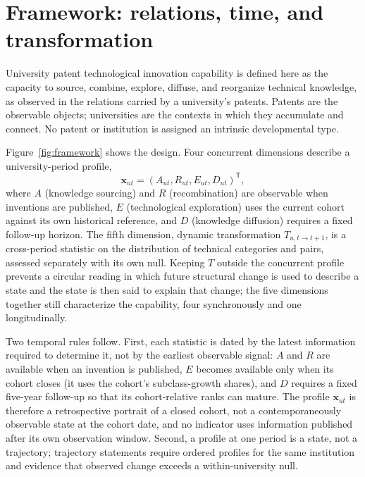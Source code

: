 \section{Framework: relations, time, and transformation}\label{sec:framework}
University patent technological innovation capability is defined here as the
capacity to source, combine, explore, diffuse, and reorganize technical
knowledge, as observed in the relations carried by a university's patents.
Patents are the observable objects; universities are the contexts in which they
accumulate and connect. No patent or institution is assigned an intrinsic
developmental type.

Figure~\ref{fig:framework} shows the design. Four concurrent dimensions
describe a university-period profile,
\begin{equation}
\mathbf{x}_{ut}=(A_{ut},R_{ut},E_{ut},D_{ut})^{\mathsf T},
\label{eq:profile}
\end{equation}
where $A$ (knowledge sourcing) and $R$ (recombination) are observable when
inventions are published, $E$ (technological exploration) uses the current
cohort against its own historical reference, and $D$ (knowledge diffusion)
requires a fixed follow-up horizon. The fifth dimension, dynamic
transformation $T_{u,t\rightarrow t+1}$, is a cross-period statistic on the
distribution of technical categories and pairs, assessed separately with its
own null. Keeping $T$ outside the concurrent profile prevents a circular
reading in which future structural change is used to describe a state and the
state is then said to explain that change; the five dimensions together still
characterize the capability, four synchronously and one longitudinally.


Two temporal rules follow. First, each statistic is dated by the latest
information required to determine it, not by the earliest observable signal:
$A$ and $R$ are available when an invention is published, $E$ becomes
available only when its cohort closes (it uses the cohort's subclass-growth
shares), and $D$ requires a fixed five-year follow-up so that its
cohort-relative ranks can mature. The profile $\mathbf{x}_{ut}$ is therefore a
retrospective portrait of a closed cohort, not a contemporaneously observable
state at the cohort date, and no indicator uses information published after its
own observation window. Second, a profile at one period is a state, not a
trajectory; trajectory statements require ordered profiles for the same
institution and evidence that observed change exceeds a within-university null.

